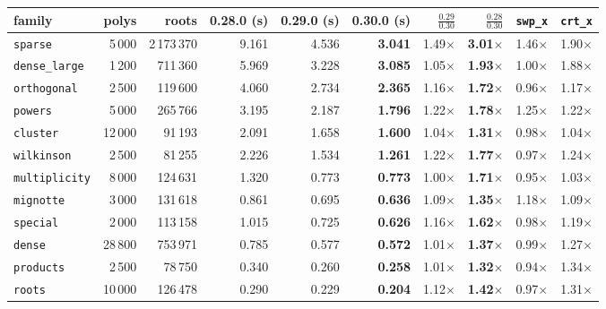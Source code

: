 \documentclass[10pt,a4paper]{article}
\theoremstyle{definition}
\numberwithin{equation}{section}
\begin{document}
\begin{table}[H]\centering\small\setlength{\tabcolsep}{4.2pt}
\begin{tabular}{lrrrrrrrrr}
\toprule
family & polys & roots & 0.28.0 (s) & 0.29.0 (s) & 0.30.0 (s) & $\frac{0.29}{0.30}$ & $\frac{0.28}{0.30}$ & \texttt{swp\_x} & \texttt{crt\_x}\\
\midrule
\texttt{sparse}       &  5\,000 & 2\,173\,370 & 9.161 & 4.536 & \textbf{3.041} & 1.49$\times$ & \textbf{3.01$\times$} & 1.46$\times$ & 1.90$\times$\\
\texttt{dense\_large} &  1\,200 &    711\,360 & 5.969 & 3.228 & \textbf{3.085} & 1.05$\times$ & \textbf{1.93$\times$} & 1.00$\times$ & 1.88$\times$\\
\texttt{orthogonal}   &  2\,500 &    119\,600 & 4.060 & 2.734 & \textbf{2.365} & 1.16$\times$ & \textbf{1.72$\times$} & 0.96$\times$ & 1.17$\times$\\
\texttt{powers}       &  5\,000 &    265\,766 & 3.195 & 2.187 & \textbf{1.796} & 1.22$\times$ & \textbf{1.78$\times$} & 1.25$\times$ & 1.22$\times$\\
\texttt{cluster}      & 12\,000 &     91\,193 & 2.091 & 1.658 & \textbf{1.600} & 1.04$\times$ & \textbf{1.31$\times$} & 0.98$\times$ & 1.04$\times$\\
\texttt{wilkinson}    &  2\,500 &     81\,255 & 2.226 & 1.534 & \textbf{1.261} & 1.22$\times$ & \textbf{1.77$\times$} & 0.97$\times$ & 1.24$\times$\\
\texttt{multiplicity} &  8\,000 &    124\,631 & 1.320 & 0.773 & \textbf{0.773} & 1.00$\times$ & \textbf{1.71$\times$} & 0.95$\times$ & 1.03$\times$\\
\texttt{mignotte}     &  3\,000 &    131\,618 & 0.861 & 0.695 & \textbf{0.636} & 1.09$\times$ & \textbf{1.35$\times$} & 1.18$\times$ & 1.09$\times$\\
\texttt{special}      &  2\,000 &    113\,158 & 1.015 & 0.725 & \textbf{0.626} & 1.16$\times$ & \textbf{1.62$\times$} & 0.98$\times$ & 1.19$\times$\\
\texttt{dense}        & 28\,800 &    753\,971 & 0.785 & 0.577 & \textbf{0.572} & 1.01$\times$ & \textbf{1.37$\times$} & 0.99$\times$ & 1.27$\times$\\
\texttt{products}     &  2\,500 &     78\,750 & 0.340 & 0.260 & \textbf{0.258} & 1.01$\times$ & \textbf{1.32$\times$} & 0.94$\times$ & 1.34$\times$\\
\texttt{roots}        & 10\,000 &    126\,478 & 0.290 & 0.229 & \textbf{0.204} & 1.12$\times$ & \textbf{1.42$\times$} & 0.97$\times$ & 1.31$\times$\\

\end{tabular}
\end{table}
\end{document}
